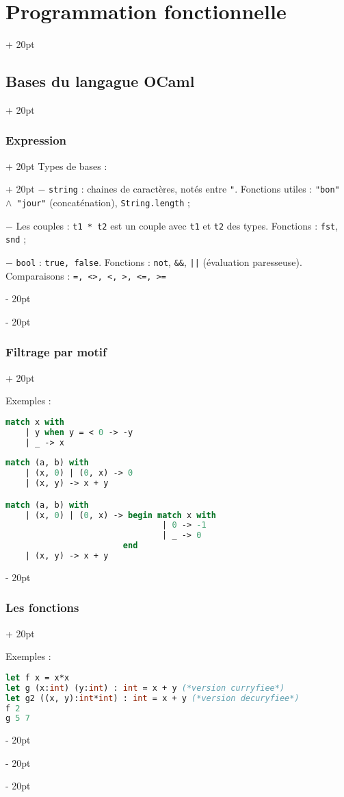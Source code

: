 \documentclass[a4paper, 12pt, twoside]{article}
\newcommand{\ind}[1][20pt]{\advance\leftskip + #1}
\newcommand{\deind}[1][20pt]{\advance\leftskip - #1}
\newenvironment{indentedenv}[1][20pt]{\par \ind[#1]}{\par \deind}
\newenvironment{indt}[2][20pt]{#2 \begin{indentedenv}[#1]}{\end{indentedenv}} %
\begin{document}
\begin{indt}{\section{Programmation fonctionnelle}}
\begin{indt}{\subsection{Bases du langague OCaml}}
\begin{indt}{\subsubsection{Expression}}
\begin{indt}{Types de bases :}
                    $-$ \texttt{string} : chaines de caractères, notés entre \texttt{"}. Fonctions utiles : \texttt{"bon" $\wedge$ "jour"} (concaténation), \texttt{String.length} ;
                    
                    $-$ Les couples : \texttt{t1 * t2} est un couple avec \texttt{t1} et \texttt{t2} des types. Fonctions : \texttt{fst}, \texttt{snd} ;
                    
                    $-$ \texttt{bool} : \texttt{true, false}. Fonctions : \texttt{not}, \texttt{\&\&}, \texttt{||} (évaluation paresseuse). Comparaisons : \texttt{=, <>, <, >, <=, >=}
                \end{indt}
            \end{indt}
            
            \vspace{12pt}
            
            \begin{indt}{\subsubsection{Filtrage par motif}}
                
                Exemples :
                \begin{lstlisting}[language=Caml, xleftmargin=80pt]
match x with
    | y when y = < 0 -> -y
    | _ -> x
    
match (a, b) with
    | (x, 0) | (0, x) -> 0
    | (x, y) -> x + y

match (a, b) with
    | (x, 0) | (0, x) -> begin match x with
                                | 0 -> -1
                                | _ -> 0
                        end
    | (x, y) -> x + y
                \end{lstlisting}
                
            \end{indt}
            
            \vspace{12pt}
            
            \begin{indt}{\subsubsection{Les fonctions}}
                
                Exemples :
                
                \begin{lstlisting}[language=Caml, xleftmargin=80pt]
let f x = x*x
let g (x:int) (y:int) : int = x + y (*version curryfiee*)
let g2 ((x, y):int*int) : int = x + y (*version decuryfiee*)
f 2
g 5 7


\end{lstlisting}
\end{indt}
\end{indt}
\end{indt}
\end{document}
